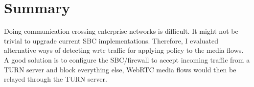 \section{Summary}
Doing communication crossing enterprise networks is difficult. It might not be trivial to upgrade current SBC implementations. Therefore, I evaluated alternative ways of detecting \gls{wrtc} traffic for applying policy to the media flows. A good solution is to configure the SBC/firewall to accept incoming traffic from a TURN server and block everything else, WebRTC media flows would then be relayed through the TURN server.